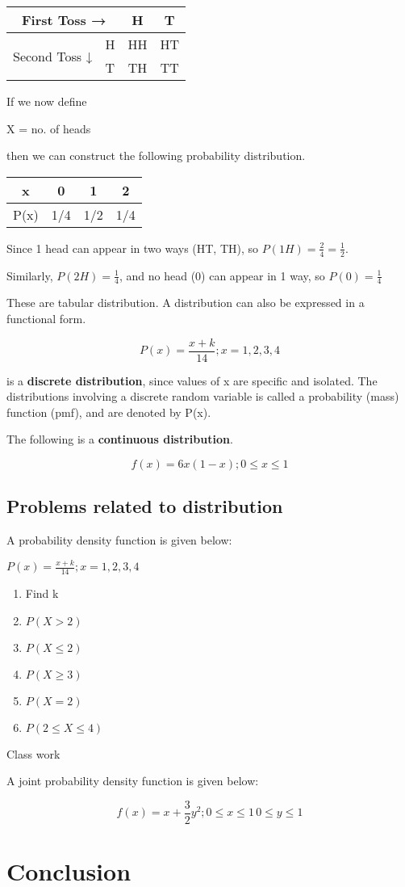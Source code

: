 \documentclass[14pt, a4paper,oneside, margin=1.4in]{book}
\begin{document}
\begin{table}[h]
\centering
\begin{tabular}{c|c|c|c}
\multicolumn{2}{c}{First Toss →}   & H  & T  \\ \hline
\multirow{2}{*}{Second Toss ↓} & H & HH & HT \\ 
                               & T & TH & TT
\end{tabular}
\end{table}

If we now define

X =  no. of heads

then we can construct the following probability distribution.
\begin{table}[h]
\centering
\begin{tabular}{c|c|c|c}
x    & 0   & 1   & 2   \\ \hline
P(x) & 1/4 & 1/2 & 1/4
\end{tabular}
\end{table}

Since 1 head can appear in two ways (HT, TH), so $P(1H)=\frac24=\frac12$.

Similarly, $P(2H)=\frac14$, and no head (0) can appear in 1 way, so $P(0) = \frac14$

These are tabular distribution. A distribution can also be expressed in a functional form. 

$$P(x) = \frac{x+k}{14}; x= 1,2,3,4$$

is a \textbf{discrete distribution}, since values of x are specific and isolated. The distributions involving a discrete random variable is called a probability (mass) function (pmf), and are denoted by P(x).

The following is a \textbf{continuous distribution}. 

\[f(x) = 6x(1-x); 0\le x \le 1\]

\section{Problems related to distribution}

\Problem A probability density function is given below:

$P(x) = \frac{x+k}{14}; x= 1,2,3,4$

\begin{enumerate}
  \item Find k
  \item $P(X>2)$
  \item $P(X \le 2)$
  \item $P(X \ge 3)$
  \item $P(X=2)$
  \item $P(2 \le X \le 4)$
\end{enumerate}

\TheSolution Class work

\Problem A joint probability density function is given below:

\[f(x) = x+ \frac32 y^2; 0\le x \le 1\, 0\le y \le 1\]



\backmatter
\chapter{Conclusion}
\lipsum[8]

\tableofcontents
\end{document}
